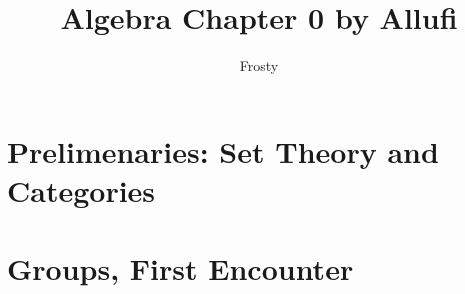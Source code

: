 \documentclass[10pt]{article}  %
\title{Algebra Chapter 0 by Allufi}
\author{Frosty}
\begin{document}
\maketitle

\tableofcontents

\section{Prelimenaries: Set Theory and Categories}

\section{Groups, First Encounter}

\end{document}
